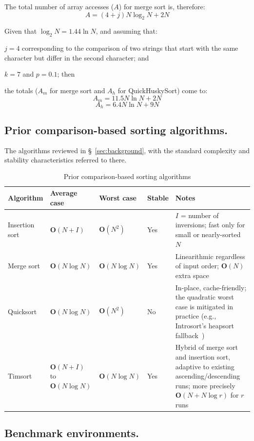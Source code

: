 \documentclass[twoside,leqno,twocolumn]{article}
\begin{document}
The total number of array accesses ($A$) for merge sort is, therefore:
\[A = (4 + j) N \log_2 N + 2 N\]
 
Given that $\log_2 N = 1.44 \ln N$, and assuming that:

$j = 4$ corresponding to the comparison of two strings that start with the same character but differ in the second character; and

$k = 7$ and $p = 0.1$; then

the totals ($A_m$ for merge sort and $A_h$ for QuickHuskySort) come to:
 \[A_m = 11.5 N \ln N + 2 N\]
 \[A_h = 6.4 N \ln N + 9 N\]

\subsection{Prior comparison-based sorting algorithms.}
\label{sec:prior-algorithms}

The algorithms reviewed in \S~\ref{sec:background}, with the standard complexity and stability
characteristics referred to there.

\begin{table}
  \caption{Prior comparison-based sorting algorithms}
  \label{tab:PriorAlgorithms}
  \centering
  \begin{tabularx}{\textwidth}{llllX}
    \toprule
    Algorithm & Average case & Worst case & Stable & Notes \\
    \midrule
    Insertion sort & $\textbf{O}(N + I)$ & $\textbf{O}(N^2)$ & Yes & $I$ = number of inversions; fast only for small or nearly-sorted $N$ \\
    Merge sort & $\textbf{O}(N \log N)$ & $\textbf{O}(N \log N)$ & Yes & Linearithmic regardless of input order; $\textbf{O}(N)$ extra space \\
    Quicksort & $\textbf{O}(N \log N)$ & $\textbf{O}(N^2)$ & No & In-place, cache-friendly; the quadratic worst case is mitigated in practice (e.g., Introsort's heapsort fallback~\cite{doi:10.1002}) \\
    Timsort & $\textbf{O}(N + I)$ to $\textbf{O}(N \log N)$ & $\textbf{O}(N \log N)$ & Yes & Hybrid of merge sort and insertion sort, adaptive to existing ascending/descending runs; more precisely $\textbf{O}(N + N \log r)$ for $r$ runs~\cite{DBLP:journals/corr/abs-1805-08612} \\
    \bottomrule
  \end{tabularx}
\end{table}

\subsection{Benchmark environments.}
\label{sec:environments}
\end{document}
